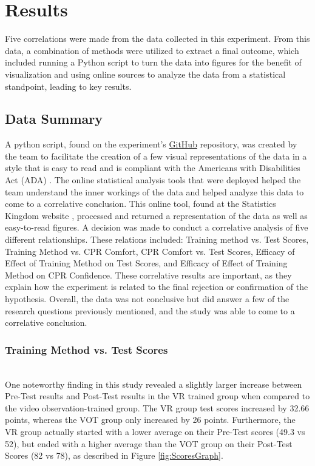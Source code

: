 \documentclass[manuscript]{./Models/acmart}
\begin{document}
\section{Results}
Five correlations were made from the data collected in this experiment. From this data, a combination of methods were utilized to extract a final outcome, which included running a Python script to turn the data into figures for the benefit of visualization and using online sources to analyze the data from a statistical standpoint, leading to key results.

\subsection{Data Summary}
A python script, found on the experiment's \href{https://github.com/csu-hci-projects/SP23-CPR-Resuscitation-Scenario-using-Virtual-Reality/blob/93a78caa6d9554e203a0d2402b1af35f86c4f6d5/DataAnalysis.py}{GitHub} repository, was created by the team to facilitate the creation of a few visual representations of the data in a style that is easy to read and is compliant with the Americans with Disabilities Act (ADA) \cite{kilin-2022}. The online statistical analysis tools that were deployed helped the team understand the inner workings of the data and helped analyze this data to come to a correlative conclusion. This online tool, found at the Statistics Kingdom website \cite{statistics-kingdom-2017}, processed and returned a representation of the data as well as easy-to-read figures. A decision was made to conduct a correlative analysis of five different relationships. These relations included: Training method vs. Test Scores, Training Method vs. CPR Comfort, CPR Comfort vs. Test Scores, Efficacy of Effect of Training Method on Test Scores, and Efficacy of Effect of Training Method on CPR Confidence. These correlative results are important, as they explain how the experiment is related to the final rejection or confirmation of the hypothesis. Overall, the data was not conclusive but did answer a few of the research questions previously mentioned, and the study was able to come to a correlative conclusion.

\subsubsection{Training Method vs. Test Scores}
\hfill\\
One noteworthy finding in this study revealed a slightly larger increase between Pre-Test results and Post-Test results in the VR trained group when compared to the video observation-trained group. The VR group test scores increased by 32.66 points, whereas the VOT group only increased by 26 points. Furthermore, the VR group actually started with a lower average on their Pre-Test scores (49.3 vs 52), but ended with a higher average than the VOT group on their Post-Test Scores (82 vs 78), as described in Figure \ref{fig:ScoresGraph}.
\end{document}
